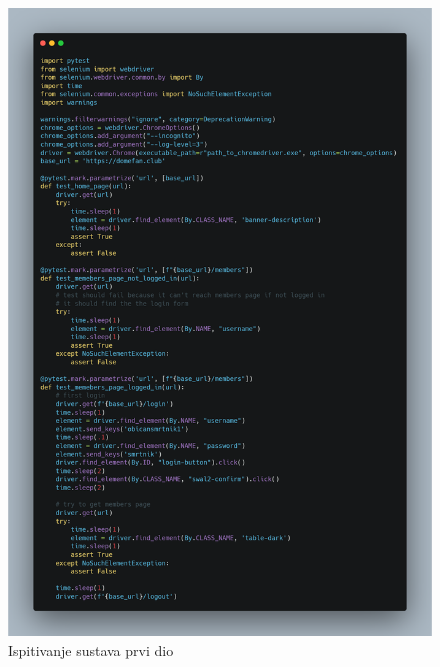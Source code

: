 			\begin{figure}[H]
				\includegraphics[width=\textwidth]{slike/IspitivanjeSustavaPrviDio.png} %
				\caption{Ispitivanje sustava prvi dio}
				\label{fig:IspitivanjeSustavaPrviDio} %
			\end{figure}

